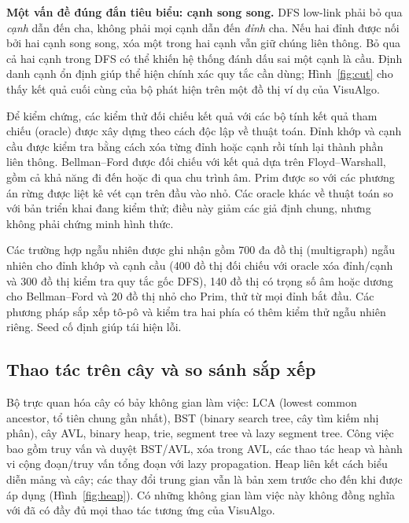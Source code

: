\documentclass[11pt,a4paper]{article}
\begin{document}
\FloatBarrier
\textbf{Một vấn đề đúng đắn tiêu biểu: cạnh song song.} DFS low-link phải bỏ qua \emph{cạnh} dẫn đến cha, không phải mọi cạnh dẫn đến \emph{đỉnh} cha. Nếu hai đỉnh được nối bởi hai cạnh song song, xóa một trong hai cạnh vẫn giữ chúng liên thông. Bỏ qua cả hai cạnh trong DFS có thể khiến hệ thống đánh dấu sai một cạnh là cầu. Định danh cạnh ổn định giúp thể hiện chính xác quy tắc cần dùng; Hình~\ref{fig:cut} cho thấy kết quả cuối cùng của bộ phát hiện trên một đồ thị ví dụ của VisuAlgo.

Để kiểm chứng, các kiểm thử đối chiếu kết quả với các bộ tính kết quả tham chiếu (oracle) được xây dựng theo cách độc lập về thuật toán. Đỉnh khớp và cạnh cầu được kiểm tra bằng cách xóa từng đỉnh hoặc cạnh rồi tính lại thành phần liên thông. Bellman--Ford được đối chiếu với kết quả dựa trên Floyd--Warshall, gồm cả khả năng đi đến hoặc đi qua chu trình âm. Prim được so với các phương án rừng được liệt kê vét cạn trên đầu vào nhỏ. Các oracle khác về thuật toán so với bản triển khai đang kiểm thử; điều này giảm các giả định chung, nhưng không phải chứng minh hình thức.

Các trường hợp ngẫu nhiên được ghi nhận gồm 700 đa đồ thị (multigraph) ngẫu nhiên cho đỉnh khớp và cạnh cầu (400 đồ thị đối chiếu với oracle xóa đỉnh/cạnh và 300 đồ thị kiểm tra quy tắc gốc DFS), 140 đồ thị có trọng số âm hoặc dương cho Bellman--Ford và 20 đồ thị nhỏ cho Prim, thử từ mọi đỉnh bắt đầu. Các phương pháp sắp xếp tô-pô và kiểm tra hai phía có thêm kiểm thử ngẫu nhiên riêng. Seed cố định giúp tái hiện lỗi.

\subsection{Thao tác trên cây và so sánh sắp xếp}
Bộ trực quan hóa cây có bảy không gian làm việc: LCA (lowest common ancestor, tổ tiên chung gần nhất), BST (binary search tree, cây tìm kiếm nhị phân), cây AVL, binary heap, trie, segment tree và lazy segment tree. Công việc bao gồm truy vấn và duyệt BST/AVL, xóa trong AVL, các thao tác heap và hành vi cộng đoạn/truy vấn tổng đoạn với lazy propagation. Heap liên kết cách biểu diễn mảng và cây; các thay đổi trung gian vẫn là bản xem trước cho đến khi được áp dụng (Hình~\ref{fig:heap}). Có những không gian làm việc này không đồng nghĩa với đã có đầy đủ mọi thao tác tương ứng của VisuAlgo.
\end{document}
